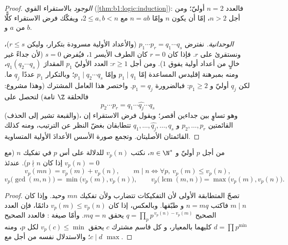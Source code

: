 \begin{proof}
\emph{الوجود} بالاستقراء القوي (\cref{thm:b1:logic:induction}):
فالعدد $n = 2$ أوليّ؛ ومن أجل $n > 2$، إمّا أن يكون $n$  وإمّا $n = ab$ مع
$2 \leq a, b < n$، ويفكّك فرض الاستقراء كلًّا من $a$ و $b$.

\emph{الوحدانية.} نفترض $p_1 \cdots p_r = q_1 \cdots q_s$
(والأعداد الأولية مسرودة بتكرار، وليكن $r \leq s$)، ونستقرئ على
$r$. فإذا كان $r = 0$ كان الطرف الأيسر $1$، فيُفرض $s = 0$ (لأن جداءً
غير خالٍ من أعداد أولية يفوق $1$). ومن أجل $r \geq 1$:  العدد الأوليّ $p_1$
المقدارَ $q_1(q_2\cdots q_s)$، ومنه بمبرهنة إقليدس المساعدة إمّا $p_1
\mid q_1$ وإمّا $p_1 \mid q_2\cdots q_s$؛ وبالتكرار  $p_1$
عددًا $q_j$ ما. لكن $q_j$ أوليّ و $p_1 \geq 2$: فبالضرورة $p_1
= q_j$. واختصر هذا العامل المشترك (وهذا مشروع: فالحلقة $\Z$ تامة) لتحصل على
\[
p_2 \cdots p_r = q_1 \cdots \widehat{q_j} \cdots q_s
\]
(والقبعة تشير إلى الحذف)، وهو تساوٍ بين جداءين أقصر؛ ويقول
فرض الاستقراء إن القائمتين $p_2, \dots, p_r$ و
$q_1, \dots, \widehat{q_j}, \dots, q_s$ تتطابقان بغضّ النظر عن الترتيب،
ومنه كذلك القائمتان الأصليتان. وتجمع صورة الأسس الأعدادَ
الأولية المتساوية.
\end{proof}

\begin{proposition}[التقييمات]\label{prop:b1:arith:valuation}
من أجل $p$ أوليّ و $n \in \N^*$، نكتب $v_p(n)$ للدلالة على أس $p$ في
تفكيك $n$ (مع $v_p(n) = 0$ إذا كان $p \nmid n$). عندئذ
\[
v_p(mn) = v_p(m) + v_p(n),
\qquad
m \mid n \iff \forall p,\ v_p(m) \leq v_p(n),
\]
\[
v_p\bigl(\gcd(m,n)\bigr) = \min\bigl(v_p(m), v_p(n)\bigr),
\qquad
v_p\bigl(\operatorname{lcm}(m,n)\bigr) = \max\bigl(v_p(m),
v_p(n)\bigr).
\]
\end{proposition}

\begin{proof}
تصحّ المتطابقة الأولى لأن التفكيكات تتضارب ولأن
تفكيك $mn$ وحيد. وإذا كان $m \mid n$ فاكتب $n = mq$ و
طبّقها. وبالعكس، إذا كان $v_p(m) \leq v_p(n)$ دائمًا، فإن العدد الصحيح $q =
\prod_p p^{\,v_p(n) - v_p(m)}$ يحقق $mq = n$. وأمّا صيغة :
فالعدد الصحيح $d = \prod p^{\min}$  كليهما بالمعيار، و
كل قاسم مشترك $c$ يحقق $v_p(c) \leq \min$ لكل $p$، ومنه $c
\mid d$؛ والاستدلال نفسه من أجل  مع $\max$.
\end{proof}

